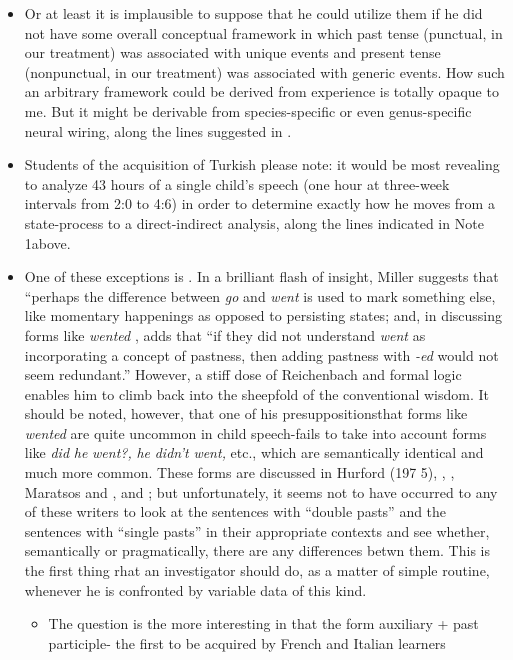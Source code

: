 \begin{itemize}
\begin{itemize}
\begin{itemize}
\begin{itemize}
\begin{itemize}
\begin{itemize}
\begin{itemize}
\begin{itemize}
\begin{itemize}
\item Or at least it is implausible to suppose that he could utilize them if he did not have some overall conceptual framework in which past tense (punctual, in our treatment) was associated with unique events and present tense (nonpunctual, in our treatment) was associ\-ated with generic events. How such an arbitrary framework could be derived from experience is totally opaque to me. But it might be derivable from species-specific or even genus-specific neural wiring, along the lines suggested in .
\item Students of the acquisition of Turkish please note: it would be most revealing to analyze 43 hours of a single child's speech (one hour at three-week intervals from 2:0 to 4:6) in order to determine exactly how he moves from a state-process to a direct-indirect analysis, along the lines indicated in Note 1above.
\item One of these exceptions is \citet{Miller1978}. In a brilliant flash of insight, Miller suggests that ``perhaps the difference between \textit{go} and \textit{went} is used to mark something else, like momentary happen\-ings as opposed to persisting states{\textquotedbl}; and, in discussing forms like \textit{wented} , adds that ``if they did not understand \textit{went} as incorporating a concept of pastness, then adding pastness with \textit{{}-ed} would not seem redundant.'' However, a stiff dose of Reichenbach and formal logic enables him to climb back into the sheepfold of the conventional wisdom. It should be noted, however, that one of his presuppositions\-that forms like \textit{wented} are quite uncommon in child speech-fails to take into account forms like \textit{did} \textit{he} \textit{went?,} \textit{he} \textit{didn't} \textit{went,} etc., which are semantically identical and much more common. These forms are discussed in Hurford (197 5), \citet{Kuczaj1976}, \citet{Fay1978}, Maratsos and \citet{Kuczaj1978}, and \citet{ErreichEtAl1980}; but unfortunately, it seems not to have occurred to any of these writers to look at the sentences with ``double pasts'' and the sentences with ``single pasts'' in their appropriate contexts and see whether, semantically or pragmatically, there are any differences betwn them. This is the first thing rhat an investigator should do, as a matter of simple routine, whenever he is confronted by variable data of this kind.

\begin{itemize}
\item The question is the more interesting in that the form auxiliary + past participle- the first to be acquired by French and Italian learners


\end{itemize}
\end{itemize}
\end{itemize}
\end{itemize}
\end{itemize}
\end{itemize}
\end{itemize}
\end{itemize}
\end{itemize}
\end{itemize}
